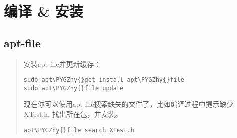 \documentclass[letterpaper,10pt,english]{sphinxmanual}
\def\PYGZhy{\char`\-}
\begin{document}
\chapter{编译 \& 安装}
\label{index:id2}

\section{apt-file}
\label{index:apt-file}\begin{quote}

安装apt-file并更新缓存：

\begin{Verbatim}[commandchars=\\\{\}]
sudo apt\PYGZhy{}get install apt\PYGZhy{}file
sudo apt\PYGZhy{}file update
\end{Verbatim}

现在你可以使用apt-file搜索缺失的文件了，比如编译过程中提示缺少XTest.h, 找出所在包，并安装。

\begin{Verbatim}[commandchars=\\\{\}]
apt\PYGZhy{}file search XTest.h
\end{Verbatim}
\end{quote}
\end{document}
